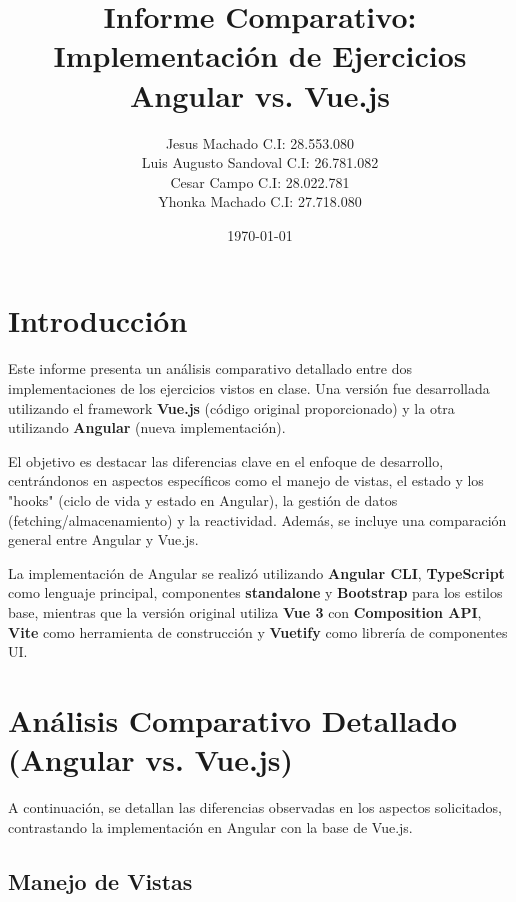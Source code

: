 \documentclass[11pt, a4paper]{article}
\title{Informe Comparativo: Implementación de Ejercicios \\ Angular vs. Vue.js}
\author{Jesus Machado C.I: 28.553.080\\
        Luis Augusto Sandoval C.I: 26.781.082 \\
        Cesar Campo C.I: 28.022.781 \\
        Yhonka Machado C.I: 27.718.080 \\
        }
\date{\today}
\begin{document}
\maketitle
\thispagestyle{empty} %
\newpage

\tableofcontents
\newpage

\section{Introducción}
Este informe presenta un análisis comparativo detallado entre dos implementaciones de los ejercicios vistos en clase. Una versión fue desarrollada utilizando el framework \textbf{Vue.js} (código original proporcionado) y la otra utilizando \textbf{Angular} (nueva implementación).

El objetivo es destacar las diferencias clave en el enfoque de desarrollo, centrándonos en aspectos específicos como el manejo de vistas, el estado y los "hooks" (ciclo de vida y estado en Angular), la gestión de datos (fetching/almacenamiento) y la reactividad. Además, se incluye una comparación general entre Angular y Vue.js.

La implementación de Angular se realizó utilizando \textbf{Angular CLI}, \textbf{TypeScript} como lenguaje principal, componentes \textbf{standalone} y \textbf{Bootstrap} para los estilos base, mientras que la versión original utiliza \textbf{Vue 3} con \textbf{Composition API}, \textbf{Vite} como herramienta de construcción y \textbf{Vuetify} como librería de componentes UI.

\section{Análisis Comparativo Detallado (Angular vs. Vue.js)}

A continuación, se detallan las diferencias observadas en los aspectos solicitados, contrastando la implementación en Angular con la base de Vue.js.

\subsection{Manejo de Vistas}
\end{document}
